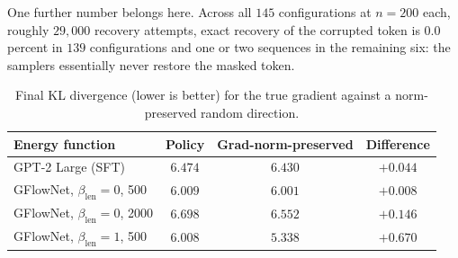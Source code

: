One further number belongs here. Across all $145$ configurations at $n = 200$ each, roughly $29{,}000$ recovery attempts, exact recovery of the corrupted token is $0.0$ percent in $139$ configurations and one or two sequences in the remaining six: the samplers essentially never restore the masked token.

\begin{table}[htbp]
    \centering
    \small
    \begin{tabular}{lccc}
        \toprule
        Energy function & Policy & Grad-norm-preserved & Difference \\
        \midrule
        GPT-2 Large (SFT) & $6.474$ & $6.430$ & $+0.044$ \\
        GFlowNet, $\beta_{\text{len}} = 0$, 500 & $6.009$ & $6.001$ & $+0.008$ \\
        GFlowNet, $\beta_{\text{len}} = 0$, 2000 & $6.698$ & $6.552$ & $+0.146$ \\
        GFlowNet, $\beta_{\text{len}} = 1$, 500 & $6.008$ & $5.338$ & $+0.670$ \\
        \bottomrule
    \end{tabular}
    \caption[Final KL for the true gradient against a norm-preserved random direction.]{Final KL divergence (lower is better) for the true gradient against a norm-preserved random direction.}
    \label{tab:fallacy}
\end{table}

